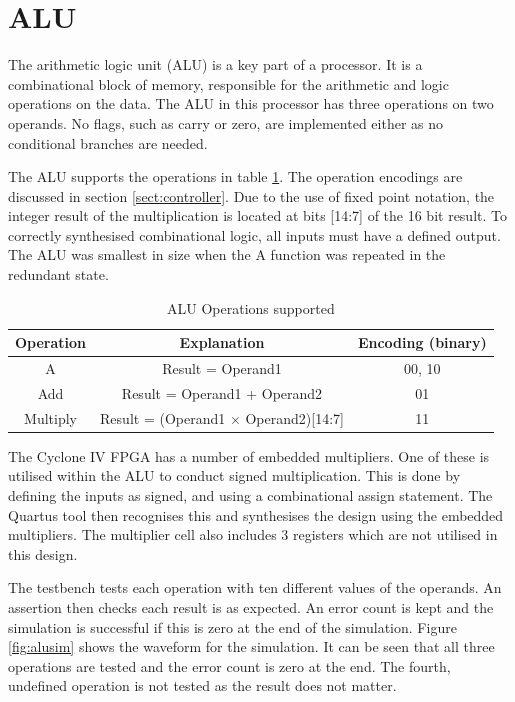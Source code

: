 

\section{ALU}

The arithmetic logic unit (ALU) is a key part of a processor. 
It is a combinational block of memory, responsible for the arithmetic and logic operations on the data.
The ALU in this processor has three operations on two operands.
No flags, such as carry or zero, are implemented either as no conditional branches are needed.

The ALU supports the operations in table \ref{tab:aluops}.
The operation encodings are discussed in section \ref{sect:controller}.
Due to the use of fixed point notation, the integer result of the multiplication is located at bits [14:7] of the 16 bit result.
To correctly synthesised combinational logic, all inputs must have a defined output.
The ALU was smallest in size when the A function was repeated in the redundant state.

\begin{table}
\caption{ALU Operations supported}
\label{tab:aluops}
\begin{tabular}{|c|c|c|} \hline
Operation & Explanation & Encoding (binary)\\  \hline
A & Result = Operand1 & 00, 10 \\
Add & Result = Operand1 + Operand2 & 01 \\
Multiply & Result = (Operand1 $\times$ Operand2)[14:7] & 11 \\ \hline
\end{tabular}
\end{table}


The Cyclone IV FPGA has a number of embedded multipliers. 
One of these is utilised within the ALU to conduct signed multiplication. 
This is done by defining the inputs as signed, and using a combinational assign statement.
The Quartus tool then recognises this and synthesises the design using the embedded multipliers.
The multiplier cell also includes 3 registers which are not utilised in this design.



The testbench tests each operation with ten different values of the operands. 
An assertion then checks each result is as expected. 
An error count is kept and the simulation is successful if this is zero at the end of the simulation.
Figure \ref{fig:alusim} shows the waveform for the simulation. 
It can be seen that all three operations are tested and the error count is zero at the end. 
The fourth, undefined operation is not tested as the result does not matter. 

